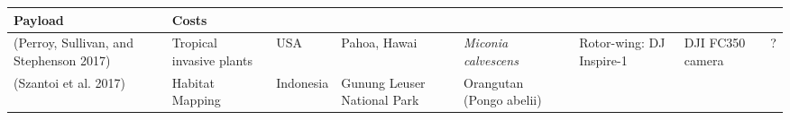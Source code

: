 \documentclass[]{interact}
\theoremstyle{plain}%
\theoremstyle{definition}
\theoremstyle{remark}
\begin{document}
\begin{longtable}[]{@{}llllllll@{}}
\begin{minipage}[b]{0.11\columnwidth}
Payload\strut
\end{minipage} & \begin{minipage}[b]{0.01\columnwidth}\raggedright\strut
Costs\strut
\end{minipage}\tabularnewline
\midrule
\endhead
\begin{minipage}[t]{0.11\columnwidth}\raggedright\strut
(Perroy, Sullivan, and Stephenson 2017)\strut
\end{minipage} & \begin{minipage}[t]{0.18\columnwidth}\raggedright\strut
Tropical invasive plants\strut
\end{minipage} & \begin{minipage}[t]{0.03\columnwidth}\raggedright\strut
USA\strut
\end{minipage} & \begin{minipage}[t]{0.14\columnwidth}\raggedright\strut
Pahoa, Hawai\strut
\end{minipage} & \begin{minipage}[t]{0.10\columnwidth}\raggedright\strut
\emph{Miconia calvescens}\strut
\end{minipage} & \begin{minipage}[t]{0.09\columnwidth}\raggedright\strut
Rotor-wing: DJ Inspire-1\strut
\end{minipage} & \begin{minipage}[t]{0.11\columnwidth}\raggedright\strut
DJI FC350 camera\strut
\end{minipage} & \begin{minipage}[t]{0.01\columnwidth}\raggedright\strut
?\strut
\end{minipage}\tabularnewline
\begin{minipage}[t]{0.11\columnwidth}\raggedright\strut
(Szantoi et al. 2017)\strut
\end{minipage} & \begin{minipage}[t]{0.18\columnwidth}\raggedright\strut
Habitat Mapping\strut
\end{minipage} & \begin{minipage}[t]{0.03\columnwidth}\raggedright\strut
Indonesia\strut
\end{minipage} & \begin{minipage}[t]{0.14\columnwidth}\raggedright\strut
Gunung Leuser National Park\strut
\end{minipage} & \begin{minipage}[t]{0.10\columnwidth}\raggedright\strut
Orangutan (Pongo abelii)\strut
\end{minipage} & \begin{minipage}[t]{0.09\columnwidth}\raggedright\strut

\end{minipage}
\end{longtable}
\end{document}
